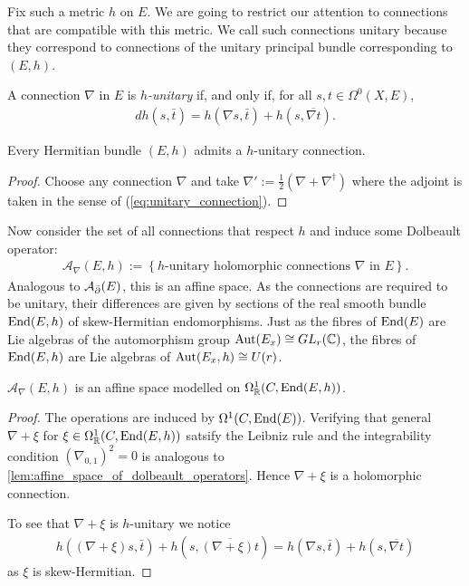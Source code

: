 \documentclass[12pt]{ociamthesis}  %
\begin{document}
Fix such a metric $h$ on $E$. We are going to restrict our attention to
connections that are compatible with this metric. We call such
connections unitary because they correspond to connections
of the unitary principal bundle corresponding to $(E,h)$.

\begin{definition}
  A connection $\nabla$ in $E$ is \emph{$h$-unitary}
  if, and only if, for all $s,t\in\Omega^0(X,E)$,
  \begin{align}\label{eq:unitary_connection}
    dh(s,\bar t) = h(\nabla s,\bar t) + h(s,\overline{\nabla t}).
  \end{align}
\end{definition}

\begin{lemma}
  Every Hermitian bundle $(E,h)$ admits a $h$-unitary connection.
  \begin{proof}
    Choose any connection $\nabla$ and take
    $\nabla' := \frac{1}{2}(\nabla + \nabla^\dagger)$
    where the adjoint is taken in the sense of
    (\ref{eq:unitary_connection}).
  \end{proof}
\end{lemma}

Now consider the set of all connections that respect $h$ and induce
some Dolbeault operator:
\begin{align*}
  \mathcal A_\nabla(E,h) := \left\lbrace{\text{$h$-unitary holomorphic connections $\nabla$ in $E$}}\right\rbrace.
\end{align*}
Analogous to $\mathcal A_{\bar{\partial}} (E)$, this is an affine space.
As the connections are required to be unitary, their differences
are given by sections of the real smooth bundle $\operatorname{End}(E,h)$ of
skew-Hermitian endomorphisms. Just as the fibres of $\operatorname{End}(E)$
are Lie algebras of the automorphism group $\operatorname{Aut}(E_x)\cong GL_r(\mathbb C)$,
the fibres of $\operatorname{End}(E,h)$ are Lie algebras of $\operatorname{Aut}(E_x,h)\cong U(r)$.

\begin{lemma}
  $\mathcal A_\nabla(E,h)$ is an affine space modelled on
  $\Omega^1_{\mathbb{R}}(C,\operatorname{End}(E,h))$.
  \begin{proof}
    The operations are induced by $\Omega^1(C,\operatorname{End}(E))$.
    Verifying that general $\nabla + \xi$ for
    $\xi\in\Omega^1_{\mathbb{R}}(C,\operatorname{End}(E,h))$
    satsify the Leibniz rule and the integrability
    condition $(\nabla_{0,1})^2=0$ is analogous to
    \ref{lem:affine_space_of_dolbeault_operators}. Hence $\nabla + \xi$
    is a holomorphic connection.

    To see that $\nabla + \xi$ is $h$-unitary we notice
    \begin{align*}
      h((\nabla + \xi)s, \bar t) + h(s,\overline{(\nabla + \xi)t})
      =  h(\nabla s, \bar t) + h(s,\overline{\nabla t})
    \end{align*}
    as $\xi$ is skew-Hermitian.
  \end{proof}
\end{lemma}
\end{document}
